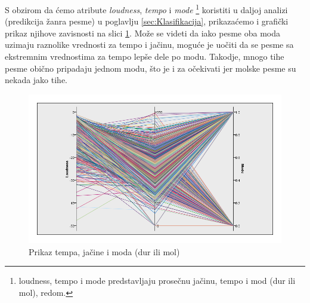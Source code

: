 S obzirom da \'c{}emo atribute \emph{loudness}, \emph{tempo} i \emph{mode} \footnote{loudness, tempo i mode predstavljaju prose\v{c}nu ja\v{c}inu, tempo i mod (dur ili mol), redom.} koristiti u daljoj analizi (predikcija \v{z}anra pesme) u poglavlju \ref{sec:Klasifikacija}, prikaza\'c{}emo i grafi\v{c}ki prikaz njihove zavisnosti na slici \ref{fig:TempoMode}. Mo\v{z}e se videti da iako pesme oba moda uzimaju raznolike vrednosti za tempo i ja\v{c}inu, mogu\'c{}e je uo\v{c}iti da se pesme sa ekstremnim vrednostima za tempo lep\v{s}e dele po modu. Takodje, mnogo tihe pesme obi\v{c}no pripadaju jednom modu, \v{s}to je i za o\v{c}ekivati jer molske pesme su nekada jako tihe.

\begin{figure}[H]
    \centering
    \includegraphics[scale=0.4]{resources/tempo-loudness-mode.png}
    \caption{Prikaz tempa, ja\v{c}ine i moda (dur ili mol)}
    \label{fig:TempoMode}
\end{figure}
